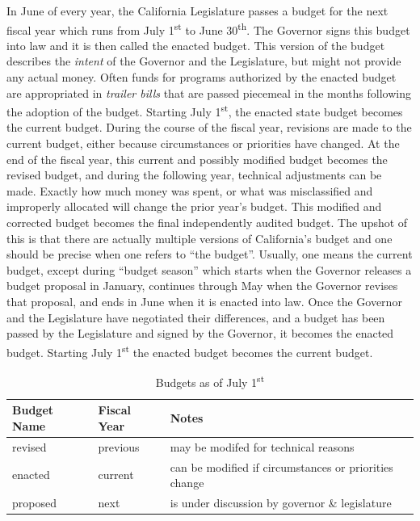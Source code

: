 In June of every year, the California Legislature passes a budget for the next fiscal year which runs from July 1\textsuperscript{st} to June 30\textsuperscript{th}. The Governor signs this budget into law and it is then called the enacted budget. This version of the budget describes the \textit{intent} of the Governor and the Legislature, but might not provide any actual money. Often funds for programs authorized by the enacted budget are appropriated in \textit{trailer bills} that are passed piecemeal in the months following the adoption of the budget. Starting July 1\textsuperscript{st}, the enacted state budget becomes the current budget. During the course of the fiscal year, revisions are made to the current budget, either because circumstances or priorities have changed. At the end of the fiscal year, this current and possibly modified budget becomes the revised budget, and during the following year, technical adjustments can be made. Exactly how much money was spent, or what was misclassified and improperly allocated will change the prior year's budget. This modified and corrected budget becomes the final independently audited budget. The upshot of this is that there are actually multiple versions of California's budget and one should be precise when one refers to ``the budget''. Usually, one means the current budget, except during ``budget season'' which starts when the Governor releases a budget proposal in January, continues through May when the Governor revises that proposal, and ends in June when it is enacted into law. Once the Governor and the Legislature have negotiated their differences, and a budget has been passed by the Legislature and signed by the Governor, it becomes the enacted budget. Starting July 1\textsuperscript{st} the enacted budget becomes the current budget.

\begin{table}[ht]
  \label{tab:july_1_budgets}%
  \OnehalfSpacing%
  \caption{Budgets as of July 1\textsuperscript{st}}%
  \begin{tabularx}{\linewidth}{lll}
    \toprule
    \textbf{Budget Name} & \textbf{Fiscal Year} & \textbf{Notes}\\
    \midrule
      revised  & previous & may be modifed for technical reasons\\
      enacted  & current  & can be modified if circumstances or priorities change\\
      proposed & next     & is under discussion by governor \& legislature\\
  \bottomrule
\end{tabularx}
\end{table}


